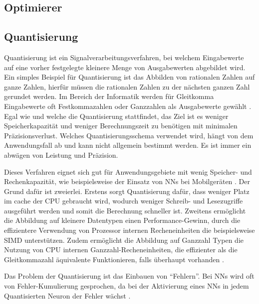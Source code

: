 \subsection{Optimierer}


\subsection{Quantisierung}

Quantisierung ist ein Signalverarbeitungsverfahren, bei welchem Eingabewerte auf eine vorher festgelegte kleinere Menge von Ausgabewerten abgebildet wird. Ein simples Beispiel für Quantisierung ist das Abbilden von rationalen Zahlen auf ganze Zahlen, hierfür müssen die rationalen Zahlen zu der nächsten ganzen Zahl gerundet werden. Im Bereich der Informatik werden für Gleitkomma Eingabewerte oft Festkommazahlen oder Ganzzahlen als Ausgabewerte gewählt \cite{Gysel2016}. Egal wie und welche die Quantisierung stattfindet, das Ziel ist es weniger Speicherkapazität und weniger Berechnungszeit zu benötigen mit minimalen Präzisionsverlust. Welches Quantisierungsschema verwendet wird, hängt von dem Anwendungsfall ab und kann nicht allgemein bestimmt werden. Es ist immer ein abwägen von Leistung und Präzision.

Dieses Verfahren eignet sich gut für Anwendungsgebiete mit wenig Speicher- und Rechenkapazität, wie beispielsweise der Einsatz von \acp{NN} bei Mobilgeräten \cite{MaQuantization2019, Gysel2016}. Der Grund dafür ist zweierlei. Erstens sorgt Quantisierung dafür, dass weniger Platz im cache der CPU gebraucht wird, wodurch weniger Schreib- und Lesezugriffe ausgeführt werden und somit die Berechnung schneller ist. Zweitens ermöglicht die Abbildung auf kleinere Datentypen einen Performance-Gewinn, durch die effizientere Verwendung von Prozessor internen Recheneinheiten die beispielsweise \ac{SIMD} unterstützen. Zudem ermöglicht die Abbildung auf Ganzzahl Typen die Nutzung von CPU internen Ganzzahl-Recheneinheiten, die effizienter als die Gleitkommazahl äquivalente Funktionieren, falls überhaupt vorhanden \cite{Jacob2017}.

Das Problem der Quantisierung ist das Einbauen von \enquote{Fehlern}. Bei \acp{NN} wird oft von Fehler-Kumulierung gesprochen, da bei der Aktivierung eines \acp{NN} in jedem Quantisierten Neuron der Fehler wächst \cite{Park2018}.

